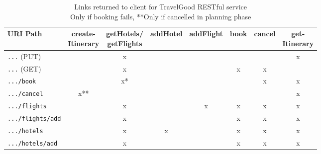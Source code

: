\begin{table}[H]
\begin{adjustwidth}{-1cm}{-1cm}
\centering
\begin{tabular}{|l|c|c|c|c|c|c|c|} \hline
URI Path & \shortstack{create- \\ Itinerary} & \shortstack{getHotels/ \\ getFlights} & addHotel & addFlight & book & cancel & \shortstack{get- \\ Itinerary}\\ \hline
\texttt{...} (PUT) 			&	&x	&	&	&	&	&x\\ \hline
\texttt{...} (GET) 			&	&x	&	&	&x	&x	&\\ \hline
\texttt{.../book} 			&	&x*	&	&	&	&x	&x\\ \hline
\texttt{.../cancel} 		&x**&	&	&	&	&	&x\\ \hline
\texttt{.../flights}		&	&x	&	&x	&x	&x	&x\\ \hline
\texttt{.../flights/add} 	&	&x	&	&	&x	&x	&x\\ \hline
\texttt{.../hotels }		&	&x	&x	&	&x	&x	&x\\ \hline
\texttt{.../hotels/add} 	&	&x	&	&	&x	&x	&x\\ \hline
\end{tabular}\\
\captionsetup{justification=centering}
\caption{Links returned to client for TravelGood RESTful service \\ \footnotesize *Only if booking fails, **Only if cancelled in planning phase}
\label{tableLinks}
\end{adjustwidth}
\end{table}
